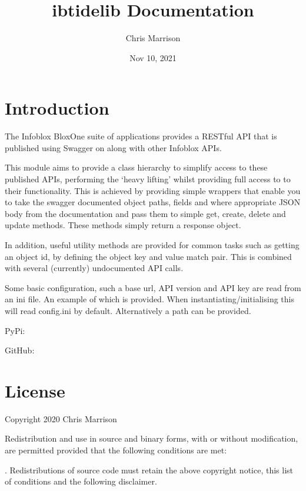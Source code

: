 \documentclass[letterpaper,10pt,english]{sphinxmanual}
\title{ibtidelib Documentation}
\date{Nov 10, 2021}
\author{Chris Marrison}
\begin{document}
\pagestyle{empty}
\sphinxmaketitle
\pagestyle{plain}
\sphinxtableofcontents
\pagestyle{normal}
\label{\detokenize{index::doc}}



\chapter{Introduction}
\label{\detokenize{intro:introduction}}\label{\detokenize{intro::doc}}
\sphinxAtStartPar
The Infoblox BloxOne suite of applications provides a RESTful API that is
published using Swagger on  along with other
Infoblox APIs.

\sphinxAtStartPar
This module aims to provide a class hierarchy to simplify access to these
published APIs, performing the ‘heavy lifting’ whilst providing full access to
to their functionality. This is achieved by providing simple wrappers that enable
you to take the swagger documented object paths, fields and where appropriate
JSON body from the documentation and pass them to simple get, create, delete and
update methods. These methods simply return a  response object.

\sphinxAtStartPar
In addition, useful utility methods are provided for common tasks such as
getting an object id, by defining the object key and value match pair. This is
combined with several (currently) undocumented API calls.

\sphinxAtStartPar
Some basic configuration, such a base url, API version and API key are read
from an ini file. An example of which is provided. When instantiating/initialising
this will read config.ini by default. Alternatively a path can be provided.

\sphinxAtStartPar
PyPi:

\sphinxAtStartPar
GitHub:


\chapter{License}
\label{\detokenize{license:license}}\label{\detokenize{license::doc}}
\sphinxAtStartPar
Copyright 2020 Chris Marrison

\sphinxAtStartPar
Redistribution and use in source and binary forms,
with or without modification, are permitted provided
that the following conditions are met:

. Redistributions of source code must retain the above copyright
notice, this list of conditions and the following disclaimer.
\end{document}
